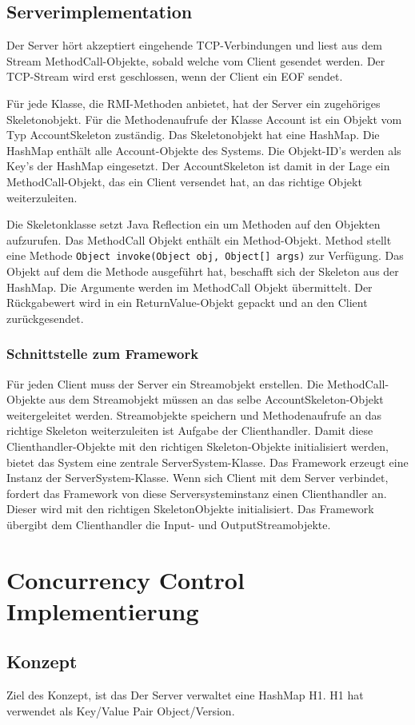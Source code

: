 \subsection{Serverimplementation}
\label{sec:serverimplementation}

Der Server hört akzeptiert eingehende TCP-Verbindungen und liest aus
dem Stream MethodCall-Objekte, sobald welche vom Client gesendet
werden. Der TCP-Stream wird erst geschlossen, wenn der Client ein EOF
sendet.

Für jede Klasse, die RMI-Methoden anbietet, hat der Server ein
zuge\-hö\-ri\-ges Skeletonobjekt. Für die Methodenaufrufe
der Klasse Account ist ein Objekt vom Typ
AccountSkeleton zuständig. Das Skeletonobjekt hat eine HashMap. Die
HashMap enthält alle Account-Objekte des Systems. Die Objekt-ID's
werden als Key's der HashMap eingesetzt. Der AccountSkeleton ist damit
in der Lage ein MethodCall-Objekt, das ein Client versendet hat, an
das richtige Objekt weiterzuleiten. 

Die Skeletonklasse setzt Java Reflection ein um Methoden auf den
Objekten aufzurufen. Das MethodCall Objekt enthält ein
Method-Objekt. Method stellt eine Methode \verb|Object invoke(Object obj, Object[] args)|\- zur\- Ver\-füg\-ung. Das Objekt auf dem die Methode
ausgeführt hat, beschafft sich der Skeleton aus der HashMap. Die
Argumente werden im MethodCall Objekt übermittelt. Der Rückgabewert
wird in ein ReturnValue-Objekt gepackt und an den Client zurückgesendet.

\subsubsection{Schnittstelle zum Framework}
\label{sec:schn-zum-fram}

Für jeden Client muss der Server ein Streamobjekt erstellen. Die
Method\-Call-Objekte aus dem Streamobjekt müssen an das selbe
AccountSkeleton-Objekt weitergeleitet werden. Streamobjekte speichern
und Methodenauf\-rufe an das richtige Skeleton weiterzuleiten ist
Aufgabe der Clienthandler. Damit diese Clienthandler-Objekte mit den
richtigen Skeleton-Objekte initialisiert werden, bietet das System
eine zentrale ServerSystem-Klasse. Das Framework erzeugt eine Instanz
der ServerSystem-Klasse. Wenn sich Client mit dem Server verbindet,
fordert das Framework von diese Serversystem\-instanz einen
Clienthandler an. Dieser wird mit den richtigen SkeletonObjekte
initialisiert. Das Framework übergibt dem Clienthandler die Input- und OutputStreamobjekte.

\section{Concurrency Control Implementierung }
\label{sec:conc-contr-impl}



\subsection{Konzept}
\label{sec:konzept}

Ziel des Konzept, ist das  
Der Server verwaltet eine HashMap H1. H1 hat verwendet als Key/Value Pair Object/Version. 




